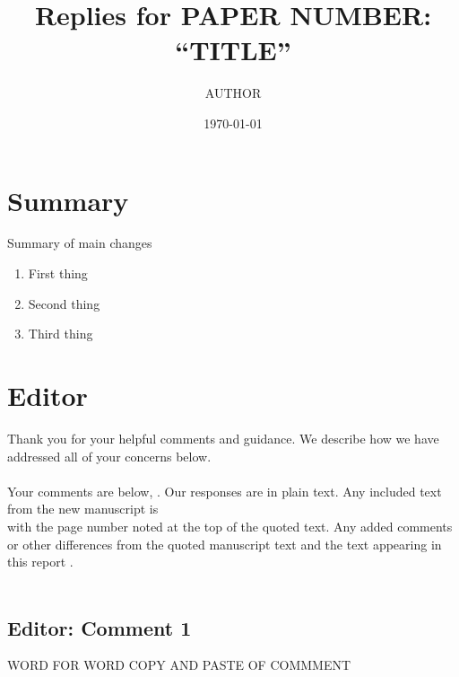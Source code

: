 \documentclass[11pt,leqno]{article}
\title{Replies for PAPER NUMBER:\\
 ``TITLE''}
\author{AUTHOR}
\date{\today}
\begin{document}
\onehalfspacing


\section*{Summary}
Summary of main changes 
\begin{enumerate}
  \item First thing     
  
  \item Second thing
  
  \item Third thing
\end{enumerate}

\newpage
\section*{Editor}
Thank you for your helpful comments and guidance. We describe how we have addressed all of your concerns below. \\
\\
Your comments are below,  . Our responses are in plain text. Any included text from the new manuscript is  \\
 with the page number noted at the top of the quoted text. 
Any added comments or other differences from the quoted manuscript text and the text appearing in this report {\color{red} {}}. \\
\\

\subsection*{Editor: Comment 1} 

\begin{tcolorbox}[left = 1em, top = 1ex, bottom = 1ex, colupper=black, colback=black!10, adjusted title = Editor: Comment 1]
    \setlength\parindent{2em}
	\noindent
	\ttfamily
	
	WORD FOR WORD COPY AND PASTE OF COMMMENT
\end{tcolorbox}
\end{document}
